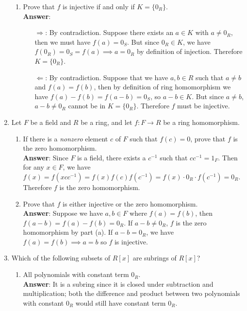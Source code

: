 \documentclass{article}
\begin{document}
\begin{enumerate}
\begin{enumerate}
                  \item Prove that $f$ is injective if and only if $K=\{0_R\}$.\\
                        \textbf{Answer}: \begin{itemize}
                              \item [$\Rightarrow$:] By contradiction. Suppose there exists an $a\in K$ with $a\neq 0_R$, then we must have $f(a)=0_S$. But since $0_R\in K$, we have $f(0_R)=0_S=f(a)\implies a=0_R$ by definition of injection. Therefore $K=\{0_R\}$.
                              \item [$\Leftarrow$:] By contradiction. Suppose that we have $a,b\in R$ such that $a\neq b$ and $f(a)=f(b)$, then by definition of ring homomorphism we have $f(a)-f(b)=f(a-b)=0_S$, so $a-b\in K$. But since $a\neq b$, $a-b\neq 0_R$ cannot be in $K=\{0_R\}$. Therefore $f$ must be injective.
                        \end{itemize}
            \end{enumerate}
      \item Let $F$ be a field and $R$ be a ring, and let $f:F\rightarrow R$ be a ring homomorphism.
            \begin{enumerate}
                  \item If there is a \textit{nonzero} element $c$ of $F$ such that $f(c)=0$, prove that $f$ is the zero homomorphism.\\
                        \textbf{Answer}: Since $F$ is a field, there exists a $c^{-1}$ such that $cc^{-1}=1_F$. Then for any $x\in F$, we have $f(x)=f(xcc^{-1})=f(x)f(c)f(c^{-1})=f(x)\cdot 0_R\cdot f(c^{-1})=0_R$. Therefore $f$ is the zero homomorphism.
                  \item Prove that $f$ is either injective or the zero homomorphism.\\
                        \textbf{Answer}: Suppose we have $a,b\in F$ where $f(a)=f(b)$, then $f(a-b)=f(a)-f(b)=0_R$. If $a-b\neq 0_R$, $f$ is the zero homomorphism by part (a). If $a-b=0_R$, we have $f(a)=f(b)\implies a=b$ so $f$ is injective.
            \end{enumerate}
      \item Which of the following subsets of $R[x]$ are subrings of $R[x]$?
            \begin{enumerate}
                  \item All polynomials with constant term $0_R$.\\
                        \textbf{Answer}: It is a subring since it is closed under subtraction and multiplication; both the difference and product between two polynomials with constant $0_R$ would still have constant term $0_R$.

\end{enumerate}
\end{enumerate}
\end{document}
